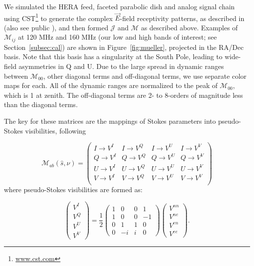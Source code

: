 \documentclass[twocolumn, trackchanges]{aastex61}
\begin{document}
We simulated the HERA feed, faceted parabolic dish and analog signal chain using CST\footnote{\url{www.cst.com}} to generate the complex $\vec{E}$-field receptivity patterns, as described in \cite{Fagnoni.16} (also see public \href{http://reionization.org/wp-content/uploads/2013/03/HERA_memo_21_CST_simulation_of_HERA_and_comparison_with_measurements.pdf}{}), and then formed $\mathcal{J}$ and $\mathcal{M}$ as described above. Examples of $\mathcal{M}_{ij}$ at 120 MHz and 160 MHz (our low and high bands of interest; see Section~\ref{subsec:cal}) are shown in Figure~\ref{fig:mueller}, projected in the RA/Dec basis. Note that this basis has a singularity at the South Pole, leading to wide-field asymmetries in Q and U. Due to the large spread in dynamic ranges between $\mathcal{M}_{00}$, other diagonal terms and off-diagonal terms, we use separate color maps for each. All of the dynamic ranges are normalized to the peak of $\mathcal{M}_{00}$, which  is 1 at zenith. The off-diagonal terms are 2- to 8-orders of magnitude less than the diagonal terms.

The key for these matrices are the mappings of Stokes parameters into pseudo-Stokes visibilities, following

\begin{equation}
\mathcal{M}_{ab}(\hat{s},\nu) =
\begin{pmatrix}
I \rightarrow V^I & I \rightarrow V^Q & I \rightarrow V^U & I \rightarrow V^V\\
Q \rightarrow V^I  & Q \rightarrow V^Q & Q \rightarrow V^U & Q \rightarrow V^V\\
U \rightarrow V^I  & U \rightarrow V^Q & U \rightarrow V^U & U \rightarrow V^V\\
V \rightarrow V^I  & V \rightarrow V^Q & V \rightarrow V^U & V \rightarrow V^V\\
\end{pmatrix}
\label{eq:Mab}
\end{equation}
where pseudo-Stokes visibilities are formed as:

\begin{equation}
\left(\begin{array}{c}
V^{I}\\
V^{Q}\\
V^{U}\\
V^{V}\end{array} \right)
= \frac{1}{2}
\left( \begin{array}{cccc}
1 & 0 & 0 & 1 \\
1 & 0 & 0 & -1 \\
0 & 1 & 1 & 0 \\
0 & -i & i & 0 \end{array} \right) 
\left(\begin{array}{c}
V^{nn}\\
V^{ne}\\
V^{en}\\
V^{ee}\end{array} \right) .
\label{eq:pseudo-stokes}
\end{equation}
\end{document}
